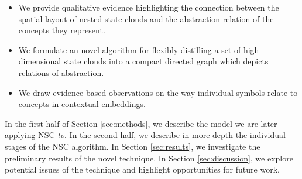 \begin{itemize}
    \item We provide qualitative evidence highlighting the connection between the spatial layout of nested state clouds and the abstraction relation of the concepts they represent.
    \item We formulate an novel algorithm for flexibly distilling a set of high-dimensional state clouds into a compact directed graph which depicts relations of abstraction.
    \item We draw evidence-based observations on the way individual symbols relate to concepts in contextual embeddings.
\end{itemize}

In the first half of Section \ref{sec:methods}, we describe the model we are later applying NSC \textit{to}. In the second half, we describe in more depth the individual stages of the NSC algorithm. In Section \ref{sec:results}, we investigate the preliminary results of the novel technique. In Section \ref{sec:discussion}, we explore potential issues of the technique and highlight opportunities for future work.